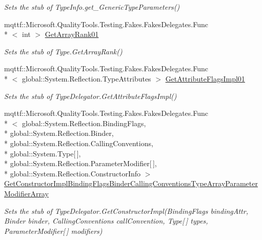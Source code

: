 \begin{DoxyCompactItemize}
\begin{DoxyCompactList}\small\item\em Sets the stub of Type\-Info.\-get\-\_\-\-Generic\-Type\-Parameters()\end{DoxyCompactList}\item 
mqttf\-::\-Microsoft.\-Quality\-Tools.\-Testing.\-Fakes.\-Fakes\-Delegates.\-Func\\*
$<$ int $>$ \hyperlink{class_system_1_1_reflection_1_1_fakes_1_1_stub_type_delegator_afc4eacf9ebf49f0f7b9ba3bb68c17ab2}{Get\-Array\-Rank01}
\begin{DoxyCompactList}\small\item\em Sets the stub of Type.\-Get\-Array\-Rank()\end{DoxyCompactList}\item 
mqttf\-::\-Microsoft.\-Quality\-Tools.\-Testing.\-Fakes.\-Fakes\-Delegates.\-Func\\*
$<$ global\-::\-System.\-Reflection.\-Type\-Attributes $>$ \hyperlink{class_system_1_1_reflection_1_1_fakes_1_1_stub_type_delegator_ac1107302b7a5b495a7e427590edb5451}{Get\-Attribute\-Flags\-Impl01}
\begin{DoxyCompactList}\small\item\em Sets the stub of Type\-Delegator.\-Get\-Attribute\-Flags\-Impl()\end{DoxyCompactList}\item 
mqttf\-::\-Microsoft.\-Quality\-Tools.\-Testing.\-Fakes.\-Fakes\-Delegates.\-Func\\*
$<$ global\-::\-System.\-Reflection.\-Binding\-Flags, \\*
global\-::\-System.\-Reflection.\-Binder, \\*
global\-::\-System.\-Reflection.\-Calling\-Conventions, \\*
global\-::\-System.\-Type\mbox{[}$\,$\mbox{]}, \\*
global\-::\-System.\-Reflection.\-Parameter\-Modifier\mbox{[}$\,$\mbox{]}, \\*
global\-::\-System.\-Reflection.\-Constructor\-Info $>$ \hyperlink{class_system_1_1_reflection_1_1_fakes_1_1_stub_type_delegator_a86a2b6bf2f354b2f4a3179876d48989c}{Get\-Constructor\-Impl\-Binding\-Flags\-Binder\-Calling\-Conventions\-Type\-Array\-Parameter\-Modifier\-Array}
\begin{DoxyCompactList}\small\item\em Sets the stub of Type\-Delegator.\-Get\-Constructor\-Impl(\-Binding\-Flags binding\-Attr, Binder binder, Calling\-Conventions call\-Convention, Type\mbox{[}$\,$\mbox{]} types, Parameter\-Modifier\mbox{[}$\,$\mbox{]} modifiers)\end{DoxyCompactList}\item 

\end{DoxyCompactItemize}
